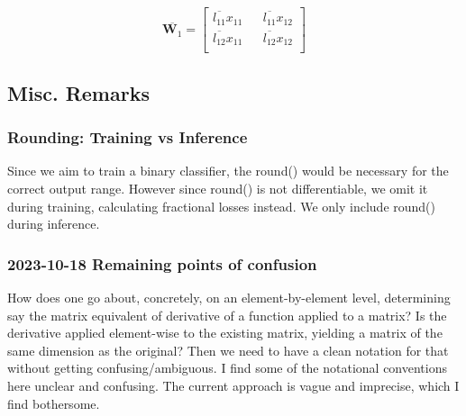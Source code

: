 \documentclass{article}
\begin{document}
\begin{equation}
    \overline{\bm{W}_1} = \begin{bmatrix}
        \overline{l_{11}}x_{11} && \overline{l_{11}} x_{12} \\
        \overline{l_{12}}x_{11} && \overline{l_{12}} x_{12} \\
    \end{bmatrix}
\end{equation}


\subsection{Misc. Remarks}
\subsubsection{Rounding: Training vs Inference} Since we aim to train a binary classifier, the round() would be necessary for the correct output range. However since round() is not differentiable, we omit it during training, calculating fractional losses instead. We only include round() during inference.
\subsubsection{2023-10-18 Remaining points of confusion} How does one go about, concretely, on an element-by-element
level, determining say the matrix equivalent of derivative of a function applied to a matrix? 
Is the derivative applied element-wise to the existing matrix, yielding a matrix of the same dimension as the original?
Then we need to have a clean notation for that without getting confusing/ambiguous. I find some of the notational
conventions here unclear and confusing. The current approach is vague and imprecise, which I find bothersome.
\end{document}
